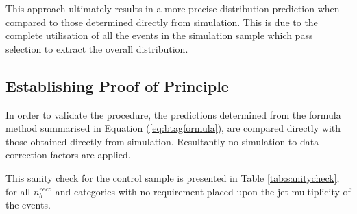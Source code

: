 This approach ultimately results in a more precise \nbreco distribution prediction when compared to those determined directly from simulation. This is due to the complete utilisation of all the events in the simulation sample which pass selection to extract the overall \nbreco distribution. 

\subsection{Establishing Proof of Principle}
\label{subsec:formulamethodsanity}

In order to validate the procedure, the predictions determined from the formula method summarised in Equation (\ref{eq:btagformula}), are compared directly with those obtained directly from simulation. Resultantly no simulation to data correction factors are applied.

This sanity check for the \mupjets control sample is presented in Table \ref{tab:sanitycheck}, for all $n_{b}^{reco}$ and \theht categories with no requirement placed upon the jet multiplicity of the events.  


